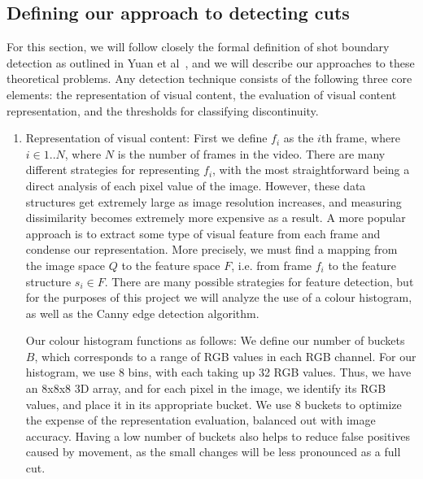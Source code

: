 \documentclass[12pt]{article}
\begin{document}
\subsection{Defining our approach to detecting cuts}
For this section, we will follow closely the formal definition of shot boundary detection as outlined in Yuan et al~\cite{survey1}, and we will describe our approaches to these 
theoretical problems. Any detection technique consists of the following three core elements: the representation of visual content, the evaluation of visual content 
representation, and the thresholds for classifying discontinuity.
\begin{enumerate}
    \item Representation of visual content: First we define $f_i$ as the $i$th frame, where $i \in 1 .. N$, where $N$ is the number of frames in the video. There are many 
    different strategies for representing $f_i$, with the most straightforward being a direct analysis of each pixel value of the image. However, these data structures get 
    extremely large as image resolution increases, and measuring dissimilarity becomes extremely more expensive as a result. A more popular approach is to extract 
    some type of visual feature from each frame and condense our representation. More precisely, we must find a mapping from the image space $Q$ to the feature space $F$,
    i.e. from frame $f_i$ to the feature structure $s_i \in F$. There are many possible strategies for feature detection, but for the purposes of this project we will 
    analyze the use of a colour histogram, as well as the Canny edge detection algorithm. 

    Our colour histogram functions as follows: We define our number of buckets $B$, which corresponds to a range of RGB values in each RGB channel. For our histogram, we use 
    8 bins, with each taking up 32 RGB values. Thus, we have an 8x8x8 3D array, and for each pixel in the image, we identify its RGB values, and place it in its appropriate 
    bucket. We use 8 buckets to optimize the expense of the representation evaluation, balanced out with image accuracy. Having a low number of buckets also helps to reduce 
    false positives caused by movement, as the small changes will be less pronounced as a full cut. 


\end{enumerate}
\end{document}
